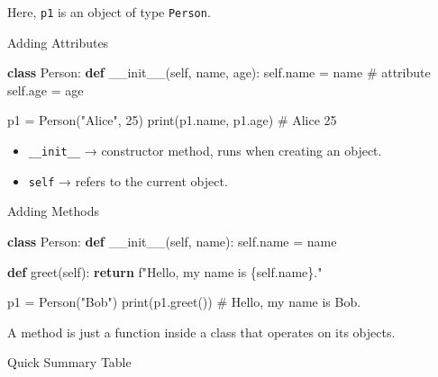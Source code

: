 \documentclass[
  letterpaper,
  DIV=11,
  numbers=noendperiod]{scrreprt}
\newenvironment{Shaded}{\begin{snugshade}}{\end{snugshade}}
\newcommand{\BuiltInTok}[1]{\textcolor[rgb]{0.00,0.23,0.31}{#1}}
\newcommand{\CommentTok}[1]{\textcolor[rgb]{0.37,0.37,0.37}{#1}}
\newcommand{\ControlFlowTok}[1]{\textcolor[rgb]{0.00,0.23,0.31}{\textbf{#1}}}
\newcommand{\DecValTok}[1]{\textcolor[rgb]{0.68,0.00,0.00}{#1}}
\newcommand{\FunctionTok}[1]{\textcolor[rgb]{0.28,0.35,0.67}{#1}}
\newcommand{\KeywordTok}[1]{\textcolor[rgb]{0.00,0.23,0.31}{\textbf{#1}}}
\newcommand{\NormalTok}[1]{\textcolor[rgb]{0.00,0.23,0.31}{#1}}
\newcommand{\OperatorTok}[1]{\textcolor[rgb]{0.37,0.37,0.37}{#1}}
\newcommand{\SpecialCharTok}[1]{\textcolor[rgb]{0.37,0.37,0.37}{#1}}
\newcommand{\SpecialStringTok}[1]{\textcolor[rgb]{0.13,0.47,0.30}{#1}}
\newcommand{\StringTok}[1]{\textcolor[rgb]{0.13,0.47,0.30}{#1}}
\newcommand{\VariableTok}[1]{\textcolor[rgb]{0.07,0.07,0.07}{#1}}
\providecommand{\tightlist}{%
  \setlength{\itemsep}{0pt}\setlength{\parskip}{0pt}}
\begin{document}
Here, \texttt{p1} is an object of type \texttt{Person}.

Adding Attributes

\begin{Shaded}
\begin{Highlighting}[]
\KeywordTok{class}\NormalTok{ Person:}
    \KeywordTok{def} \FunctionTok{\_\_init\_\_}\NormalTok{(}\VariableTok{self}\NormalTok{, name, age):}
        \VariableTok{self}\NormalTok{.name }\OperatorTok{=}\NormalTok{ name    }\CommentTok{\# attribute}
        \VariableTok{self}\NormalTok{.age }\OperatorTok{=}\NormalTok{ age}

\NormalTok{p1 }\OperatorTok{=}\NormalTok{ Person(}\StringTok{"Alice"}\NormalTok{, }\DecValTok{25}\NormalTok{)}
\BuiltInTok{print}\NormalTok{(p1.name, p1.age)   }\CommentTok{\# Alice 25}
\end{Highlighting}
\end{Shaded}

\begin{itemize}
\tightlist
\item
  \texttt{\_\_init\_\_} → constructor method, runs when creating an
  object.
\item
  \texttt{self} → refers to the current object.
\end{itemize}

Adding Methods

\begin{Shaded}
\begin{Highlighting}[]
\KeywordTok{class}\NormalTok{ Person:}
    \KeywordTok{def} \FunctionTok{\_\_init\_\_}\NormalTok{(}\VariableTok{self}\NormalTok{, name):}
        \VariableTok{self}\NormalTok{.name }\OperatorTok{=}\NormalTok{ name}

    \KeywordTok{def}\NormalTok{ greet(}\VariableTok{self}\NormalTok{):}
        \ControlFlowTok{return} \SpecialStringTok{f"Hello, my name is }\SpecialCharTok{\{}\VariableTok{self}\SpecialCharTok{.}\NormalTok{name}\SpecialCharTok{\}}\SpecialStringTok{."}

\NormalTok{p1 }\OperatorTok{=}\NormalTok{ Person(}\StringTok{"Bob"}\NormalTok{)}
\BuiltInTok{print}\NormalTok{(p1.greet())   }\CommentTok{\# Hello, my name is Bob.}
\end{Highlighting}
\end{Shaded}

A method is just a function inside a class that operates on its objects.

Quick Summary Table
\end{document}
